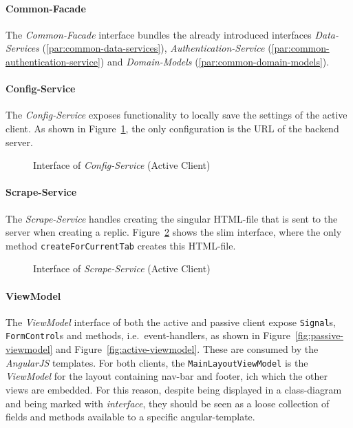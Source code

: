 \paragraph{Common-Facade}
The \textit{Common-Facade} interface bundles the already introduced interfaces \textit{Data-Services} (\ref{par:common-data-services}), \textit{Authentication-Service} (\ref{par:common-authentication-service}) and \textit{Domain-Models} (\ref{par:common-domain-models}).

\paragraph{Config-Service}\label{par:active-config-service}
The \textit{Config-Service} exposes functionality to locally save the settings of the active client.
As shown in Figure~\ref{fig:active-config-service}, the only configuration is the URL of the backend server.

\begin{figure}
    \centering

    \caption{Interface of \textit{Config-Service} (Active Client)}
    \label{fig:active-config-service}
\end{figure}

\paragraph{Scrape-Service}\label{par:active-scrape-service}
The \textit{Scrape-Service} handles creating the singular HTML-file that is sent to the server when creating a replic.
Figure~\ref{fig:active-scrape-service} shows the slim interface, where the only method \texttt{createForCurrentTab} creates this HTML-file.

\begin{figure}
    \centering

    \caption{Interface of \textit{Scrape-Service} (Active Client)}
    \label{fig:active-scrape-service}
\end{figure}

\paragraph{ViewModel}\label{par:viewmodel}
The \textit{ViewModel} interface of both the active and passive client expose \texttt{Signal}s, \texttt{FormControl}s and methods, i.e.\ event-handlers, as shown in Figure~\ref{fig:passive-viewmodel} and Figure~\ref{fig:active-viewmodel}.
These are consumed by the \textit{AngularJS} templates.
For both clients, the \texttt{MainLayoutViewModel} is the \textit{ViewModel} for the layout containing nav-bar and footer, ich which the other views are embedded.
For this reason, despite being displayed in a class-diagram and being marked with \textit{interface}, they should be seen as a loose collection of fields and methods available to a specific angular-template.

